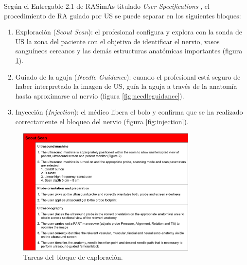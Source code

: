 Según el Entregable 2.1 de \ac{RASimAs} titulado \emph{User Specifications} \cite{ded2.1}, el procedimiento de \ac{RA} guiado por \ac{US} se puede separar en los siguientes bloques:
\begin{enumerate}
    \item Exploración (\emph{Scout Scan}): el profesional configura y explora con la sonda de \ac{US} la zona del paciente con el objetivo de identificar el nervio, vasos sanguíneos cercanos y las demás estructuras anatómicas importantes (figura \ref{fig:scoutscan}). 

    \item Guiado de la aguja (\emph{Needle Guidance}): cuando el profesional está seguro de haber interpretado la imagen de \ac{US}, guía la aguja a través de la anatomía hasta aproximarse al nervio (figura \ref{fig:needleguidance}).  
   
    \item Inyección (\emph{Injection}): el médico libera el bolo y confirma que se ha realizado correctamente el bloqueo del nervio (figura \ref{fig:injection}). 
   
\end{enumerate}
\begin{figure}[thbp]
  \centering
    \includegraphics[width=0.8\textwidth]{IMG/scoutscan.png}
    \caption{Tareas del bloque de exploración. }
  \label{fig:scoutscan}
   
\end{figure}
